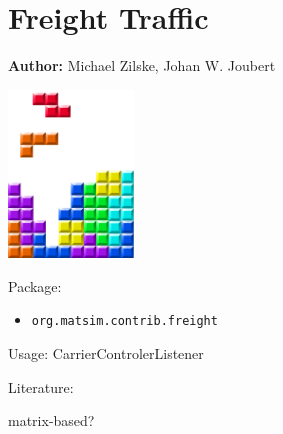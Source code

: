 \chapter{Freight Traffic }
\label{ch:freight}

\hfill \textbf{Author:} Michael Zilske, Johan W. Joubert

\begin{center} \includegraphics[width=0.25\textwidth, angle=0]{figures/MATSimBook.png} \end{center}


Package:
\begin{itemize}
	\item \lstinline|org.matsim.contrib.freight|
\end{itemize}

Usage: CarrierControlerListener

Literature: \citet[][]{ZilskeEtAl_TechRep_VSP_2012, ShahM_TechRep_IVT_2010}

matrix-based?






